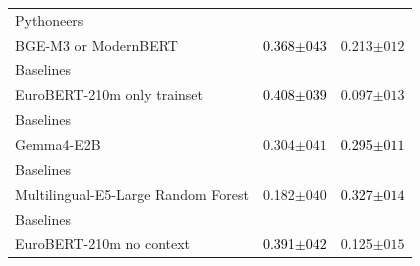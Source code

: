 \begin{tabularx}{\textwidth}{X | c c}
Pythoneers\\\subcatarrow{}BGE-M3 or ModernBERT & \textcolor{Black}{0.368$\pm{}043$} & \textcolor{White!50!NavyBlue}{0.213$\pm{}012$} \\
Baselines\\\subcatarrow{}EuroBERT-210m only trainset & \textcolor{Black}{0.408$\pm{}039$} & \textcolor{NavyBlue}{0.097$\pm{}013$} \\
Baselines\\\subcatarrow{}Gemma4-E2B & \textcolor{White!50!NavyBlue}{0.304$\pm{}041$} & \textcolor{Black}{0.295$\pm{}011$} \\
Baselines\\\subcatarrow{}Multilingual-E5-Large Random Forest & \textcolor{NavyBlue}{0.182$\pm{}040$} & \textcolor{Black}{0.327$\pm{}014$} \\
Baselines\\\subcatarrow{}EuroBERT-210m no context & \textcolor{Black}{0.391$\pm{}042$} & \textcolor{NavyBlue}{0.125$\pm{}015$} \\
\hline
\end{tabularx}